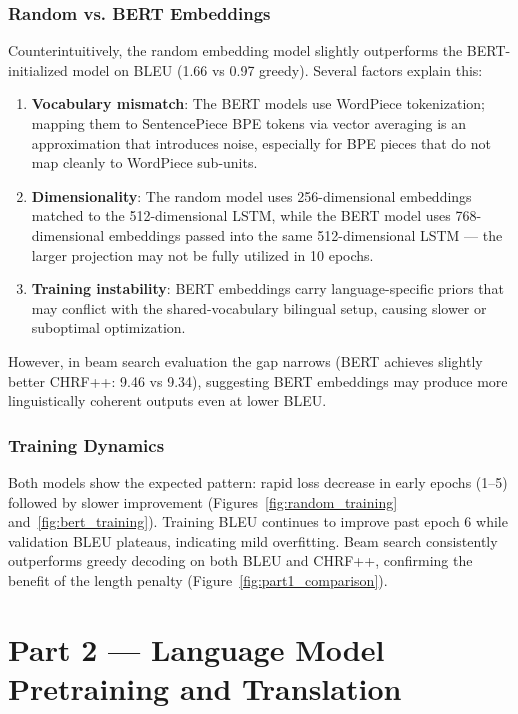 \documentclass[12pt,a4paper]{article}
\begin{document}
\subsubsection{Random vs. BERT Embeddings}

Counterintuitively, the random embedding model slightly outperforms the BERT-initialized model on BLEU (1.66 vs 0.97 greedy). Several factors explain this:

\begin{enumerate}
    \item \textbf{Vocabulary mismatch}: The BERT models use WordPiece tokenization; mapping them to SentencePiece BPE tokens via vector averaging is an approximation that introduces noise, especially for BPE pieces that do not map cleanly to WordPiece sub-units.
    \item \textbf{Dimensionality}: The random model uses 256-dimensional embeddings matched to the 512-dimensional LSTM, while the BERT model uses 768-dimensional embeddings passed into the same 512-dimensional LSTM — the larger projection may not be fully utilized in 10 epochs.
    \item \textbf{Training instability}: BERT embeddings carry language-specific priors that may conflict with the shared-vocabulary bilingual setup, causing slower or suboptimal optimization.
\end{enumerate}

However, in beam search evaluation the gap narrows (BERT achieves slightly better CHRF++: 9.46 vs 9.34), suggesting BERT embeddings may produce more linguistically coherent outputs even at lower BLEU.

\subsubsection{Training Dynamics}

Both models show the expected pattern: rapid loss decrease in early epochs (1–5) followed by slower improvement (Figures~\ref{fig:random_training} and~\ref{fig:bert_training}). Training BLEU continues to improve past epoch 6 while validation BLEU plateaus, indicating mild overfitting. Beam search consistently outperforms greedy decoding on both BLEU and CHRF++, confirming the benefit of the length penalty (Figure~\ref{fig:part1_comparison}).

\section{Part 2 — Language Model Pretraining and Translation}
\end{document}

